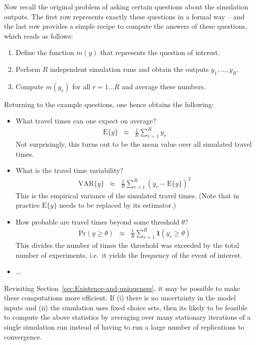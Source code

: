 Now recall the original problem of asking certain questions about
the simulation outputs. The first row 
represents exactly these questions in a formal way -- and the last
row  provides a simple recipe to compute
the answers of these questions, which reads as follows:
\begin{enumerate}
\item Define the function $m(y)$ that represents the question of interest.
\item Perform $R$ independent simulation runs and obtain the outputs $y_{1},\ldots,y_{R}$.
\item Compute $m(y_{r})$ for all $r=1\ldots R$ and average these numbers.
\end{enumerate}
Returning to the example questions, one hence obtains the following:
\begin{itemize}
\item What travel times can one expect on average?
\begin{eqnarray}
\text{E}\{y\} & \approx & \frac{1}{R}\sum_{r=1}^{R}y_{r}
\end{eqnarray}
Not surprisingly, this turns out to be the mean value over all simulated
travel times.
\item What is the travel time variability?
\begin{eqnarray}
\text{VAR}\{y\} & \approx & \frac{1}{R}\sum_{r=1}^{R}(y_{r}-\text{E}\{y\})^{2}
\end{eqnarray}
This is the empirical variance of the simulated travel times. (Note
that in practice $\text{E}\{y\}$ needs to be replaced by its estimator.)
\item How probable are travel times beyond some threshold $\theta$?
\begin{eqnarray}
\text{Pr}(y\geq\theta) & \approx & \frac{1}{R}\sum_{r=1}^{R}\mathbf{1}(y_{r}\geq\theta)
\end{eqnarray}
This divides the number of times the threshold was exceeded by the
total number of experiments, i.e.\ it yields the frequency of the event
of interest.
\item ...
\end{itemize}
Revisiting Section~\ref{sec:Existence-and-uniqueness}, it may
be possible to make these computations more efficient. If (i) there
is no uncertainty in the model inputs and (ii) the simulation uses
fixed choice sets, then its likely to be feasible to compute the above
statistics by averaging over many stationary iterations of a single
simulation run instead of having to run a large number of replications
to convergence. 

